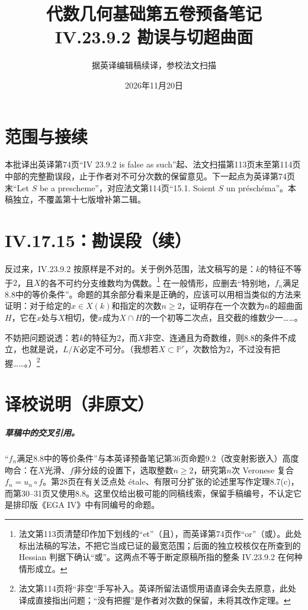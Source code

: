 \documentclass[openany,fontset=fandol]{ctexbook}
\begin{document}
\title{代数几何基础第五卷预备笔记\\IV.23.9.2 勘误与切超曲面}
\author{据英译编辑稿续译，参校法文扫描}
\date{2026年11月20日}
\maketitle
\chapter*{范围与接续}
本批译出英译第74页“IV 23.9.2 is false as such”起、法文扫描第113页末至第114页中部的完整勘误段，止于作者对不可分次数的保留意见。下一起点为英译第74页末“Let $S$ be a prescheme”，对应法文第114页“15.1. Soient $S$ un préschéma”。本稿独立，不覆盖第十七版增补第二辑。
\chapter*{IV.17.15：勘误段（续）}
反过来，IV.23.9.2 按原样是不对的。关于例外范围，法文稿写的是：$k$的特征不等于$2$，且$X$的各不可约分支维数均为偶数。\footnote{法文第113页清楚印作加下划线的“et”（且），而英译第74页作“or”（或）。此处标出法稿的写法，不把它当成已证的最宽范围；后面的独立校核仅在所查到的 Hessian 判据下确认“或”。这两点不等于断定原稿所指的整条 IV.23.9.2 在何种情形成立。}
在一般情形，应删去“特别地，$f_n$满足8.8中的等价条件”。命题的其余部分看来是正确的，应该可以用相当类似的方法来证明：对于给定的$x\in X(k)$和指定的次数$n\ge2$，证明存在一个次数为$n$的超曲面$H$，它在$x$处与$X$相切，使$x$成为$X\cap H$的一个初等二次点，且交截的维数少一……。

不妨把问题说透：若$k$的特征为$2$，而$X$非空、连通且为奇数维，则8.8的条件不成立，也就是说，$L/K$必定不可分。（我想若$X\subset\mathbb P^r$，次数恰为$2$，不过没有把握……。）\footnote{法文第114页将“非空”手写补入。英译所留法语惯用语直译会失去原意，此处译成直接指出问题；“没有把握”是作者对次数的保留，未将其改作定理。}
\chapter*{译校说明（非原文）}
\enlargethispage{5\baselineskip}
\paragraph{草稿中的交叉引用。}
“$f_n$满足8.8中的等价条件”与本英译预备笔记第36页命题9.2（改变射影嵌入）高度吻合：在$X$光滑、$f$非分歧的设置下，选取整数$n\ge2$，研究第$n$次 Veronese 复合$f_n=u_n\circ f$。第28页在有关泛点处 étale、有限可分扩张的论述里写作定理8.7(c)，而第30--31页又使用8.8。这里仅给出极可能的同稿线索，保留手稿编号，不认定它是排印版《EGA IV》中有同编号的命题。
\end{document}
